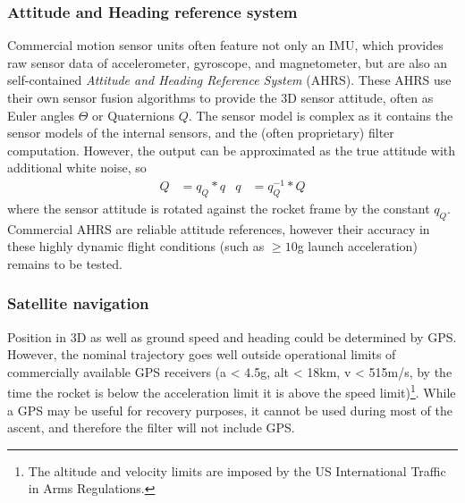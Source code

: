 \subsubsection{Attitude and Heading reference system}
Commercial motion sensor units often feature not only an IMU, which provides raw sensor data of accelerometer, gyroscope, and magnetometer, but are also an self-contained \emph{Attitude and Heading Reference System} (AHRS).
These AHRS use their own sensor fusion algorithms to provide the 3D sensor attitude, often as Euler angles $\Theta$ or Quaternions $Q$.
The sensor model is complex as it contains the sensor models of the internal sensors, and the (often proprietary) filter computation.
However, the output can be approximated as the true attitude with additional white noise, so
\begin{align}
    Q &= q_Q * q & q &= q_Q^{-1} * Q
\end{align}
where the sensor attitude is rotated against the rocket frame by the constant $q_Q$.
Commercial AHRS are reliable attitude references, however their accuracy in these highly dynamic flight conditions (such as $\geq 10$g launch acceleration) remains to be tested.


\subsubsection{Satellite navigation}
Position in 3D as well as ground speed and heading could be determined by GPS.
However, the nominal trajectory goes well outside operational limits of commercially available GPS receivers (a < 4.5g, alt < 18km, v < 515m/s, by the time the rocket is below the acceleration limit it is above the speed limit)\footnote{The altitude and velocity limits are imposed by the US International Traffic in Arms Regulations.}.
While a GPS may be useful for recovery purposes, it cannot be used during most of the ascent, and therefore the filter will not include GPS.

